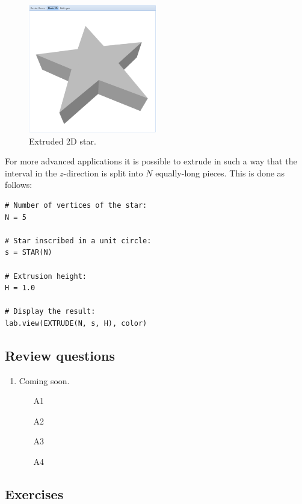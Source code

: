 \documentclass{article}
\begin{document}
\begin{figure}[!ht]
\begin{center}
\includegraphics[width=0.5\textwidth]{img/star-2.png}
\end{center}
\vspace{-2mm}
\caption{Extruded 2D star.}
\label{fig:star-2}
\end{figure}
\noindent
For more advanced applications it is possible to extrude in such a way that 
the interval in the $z$-direction is split into $N$ equally-long pieces.
This is done as follows:

\begin{verbatim}
# Number of vertices of the star:
N = 5

# Star inscribed in a unit circle:
s = STAR(N)

# Extrusion height:
H = 1.0

# Display the result:
lab.view(EXTRUDE(N, s, H), color)
\end{verbatim}

\subsection{Review questions}

\begin{enumerate}
\item Coming soon.
\begin{itemize}
\item[A1]
\item[A2]
\item[A3]
\item[A4]
\end{itemize}
\end{enumerate}

\subsection{Exercises}
\end{document}
